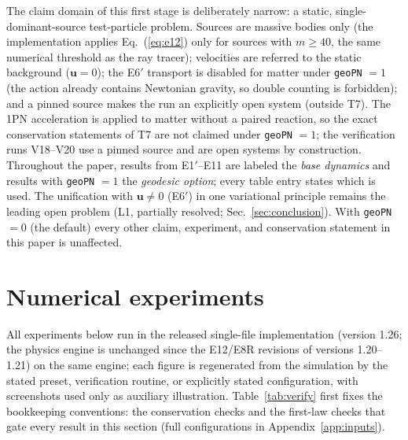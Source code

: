 \documentclass[aps,reprint,amsmath,amssymb,nofootinbib,superscriptaddress,floatfix]{revtex4-2}
\newcommand{\vect}[1]{\bm{#1}}
\begin{document}
The claim domain of this first stage is deliberately narrow: a static,
single-dominant-source test-particle problem.
Sources are massive bodies only (the implementation applies
Eq.~(\ref{eq:e12}) only for sources with $m \ge 40$, the same
numerical threshold as the ray tracer); velocities are referred to the
static background ($\vect{u} = 0$); the E6$'$ transport is disabled
for matter under \texttt{geoPN} $= 1$ (the action already contains
Newtonian gravity, so double counting is forbidden); and a pinned
source makes the run an explicitly open system (outside T7).
The 1PN acceleration is applied to matter without a paired reaction,
so the exact conservation statements of T7 are not claimed under
\texttt{geoPN} $= 1$; the verification runs V18--V20 use a pinned
source and are open systems by construction.
Throughout the paper, results from E1$'$--E11 are labeled the
\emph{base dynamics} and results with \texttt{geoPN} $= 1$ the
\emph{geodesic option}; every table entry states which is used.
The unification with $\vect{u} \ne 0$ (E6$'$) in one variational
principle remains the leading open problem (L1, partially resolved;
Sec.~\ref{sec:conclusion}).
With \texttt{geoPN} $= 0$ (the default) every other claim, experiment,
and conservation statement in this paper is unaffected.

\section{Numerical experiments}
\label{sec:experiments}

All experiments below run in the released single-file implementation
(version 1.26; the physics engine is unchanged since the E12/E8R
revisions of versions 1.20--1.21) on the same engine; each figure is
regenerated from the simulation by the stated preset, verification
routine, or explicitly stated configuration, with
screenshots used only as auxiliary illustration.
Table~\ref{tab:verify} first fixes the bookkeeping conventions: the
conservation checks and the first-law checks that gate every result in
this section (full configurations in Appendix~\ref{app:inputs}).
\end{document}
